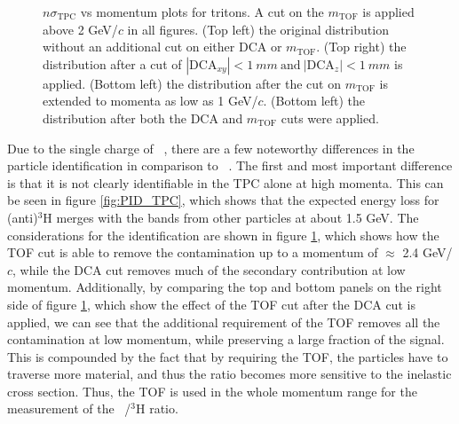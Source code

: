 \begin{figure}
    \caption{$n\sigma_{\mathrm{TPC}}$ vs momentum plots for tritons. A cut on the $m_{\mathrm{TOF}}$ is applied above 2 GeV/$c$ in all figures. (Top left) the original distribution without an additional cut on either DCA or $m_{\mathrm{TOF}}$. (Top right) the distribution after a cut of $|\mathrm{DCA}_{xy}|<1\ mm\ \textrm{and}\  |\mathrm{DCA}_z|<1\ mm$ is applied. (Bottom left) the distribution after the cut on $m_{\mathrm{TOF}}$ is extended to momenta as low as 1 GeV/$c$. (Bottom left) the distribution after both the DCA and $m_{\mathrm{TOF}}$ cuts were applied.}
    \label{fig:Tritons_momentum_range}
\end{figure}
Due to the single charge of \atrit\ , there are a few noteworthy differences in the particle identification in comparison to \ahe\ . The first and most important difference is that it is not clearly identifiable in the TPC alone at high momenta. This can be seen in figure \ref{fig:PID_TPC}, which shows that the expected energy loss for (anti)$^3\mathrm{H}$ merges with the bands from other particles at about 1.5 GeV. The considerations for the identification are shown in figure \ref{fig:Tritons_momentum_range}, which shows how the TOF cut is able to remove the contamination up to a momentum of $\approx$ 2.4 GeV/$c$, while the DCA cut removes much of the secondary contribution at low momentum. Additionally, by comparing the top and bottom panels on the right side of figure \ref{fig:Tritons_momentum_range}, which show the effect of the TOF cut after the DCA cut is applied, we can see that the additional requirement of the TOF removes all the contamination at low momentum, while preserving a large fraction of the signal. This is compounded by the fact that by requiring the TOF, the particles have to traverse more material, and thus the ratio becomes more sensitive to the inelastic cross section. Thus, the TOF is used in the whole momentum range for the measurement of the \atrit\ /$^3\mathrm{H}$ ratio. 


